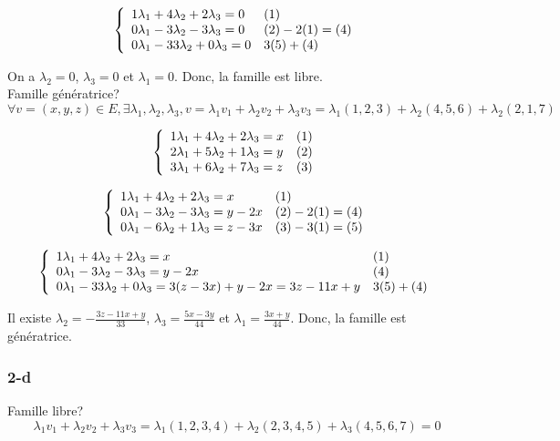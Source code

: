 \documentclass[]{book}
\theoremstyle{definition}
\begin{document}
$$
\left\{ 
\begin{array}{l l}
1 \lambda_1 + 4 \lambda_2 + 2 \lambda_3 = 0 & (1)\\
0 \lambda_1 - 3 \lambda_2 - 3 \lambda_3 = 0 & (2) - 2(1) = (4)\\
0 \lambda_1 - 33 \lambda_2 + 0 \lambda_3 = 0 & 3(5) + (4)\\
\end{array}
\right. 
$$ 


On a $\lambda_2 = 0$, $\lambda_3 = 0$ et $\lambda_1 = 0$. Donc, la famille est libre. \\

Famille g\'en\'eratrice?
$$\forall v = (x,y,z) \in E, \exists \lambda_1, \lambda_2, \lambda_3, v = \lambda_1 v_1 + \lambda_2 v_2 + \lambda_3 v_3 = \lambda_1 (1,2,3) + \lambda_2 (4,5,6) + \lambda_2 (2,1,7)$$

$$
\left\{ 
\begin{array}{l l}
1 \lambda_1 + 4 \lambda_2 + 2 \lambda_3 = x & (1)\\
2 \lambda_1 + 5 \lambda_2 + 1 \lambda_3 = y & (2)\\
3 \lambda_1 + 6 \lambda_2 + 7 \lambda_3 = z & (3)\\
\end{array}
\right. 
$$ 

$$
\left\{ 
\begin{array}{l l}
1 \lambda_1 + 4 \lambda_2 + 2 \lambda_3 = x & (1)\\
0 \lambda_1 - 3 \lambda_2 - 3 \lambda_3 = y-2x & (2) - 2(1) = (4)\\
0 \lambda_1 - 6 \lambda_2 + 1 \lambda_3 = z-3x & (3) - 3(1) = (5)\\
\end{array}
\right. 
$$ 

$$
\left\{ 
\begin{array}{l l}
1 \lambda_1 + 4 \lambda_2 + 2 \lambda_3 = x & (1)\\
0 \lambda_1 - 3 \lambda_2 - 3 \lambda_3 = y-2x & (4)\\
0 \lambda_1 - 33 \lambda_2 + 0 \lambda_3 = 3(z-3x)+y-2x = 3z-11x+y & 3(5) + (4)\\
\end{array}
\right. 
$$ 


Il existe $\lambda_2 = -\frac{3z-11x+y}{33}$, $\lambda_3 = \frac{5x -3y}{44}$ et $\lambda_1 = \frac{3x + y}{44}$. Donc, la famille est g\'en\'eratrice.

\subsubsection*{2-d}
Famille libre? \\
$$\lambda_1 v_1 + \lambda_2 v_2 + \lambda_3 v_3 = \lambda_1 (1,2,3,4) + \lambda_2 (2,3,4,5) + \lambda_3 (4,5,6,7)  = 0$$
\end{document}
